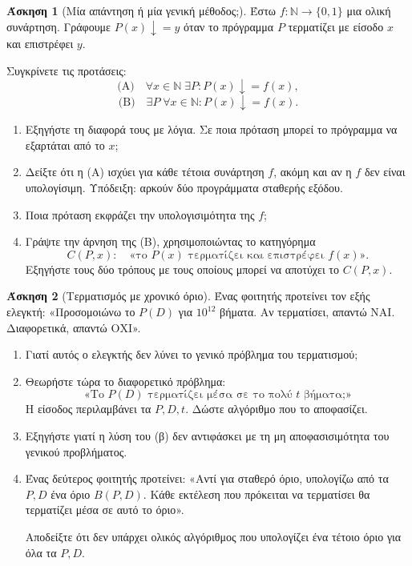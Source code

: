 \documentclass[11pt,a4paper]{article}
\theoremstyle{definition}
\newtheorem{question}{Άσκηση}
\begin{document}
 


\begin{question}[Μία απάντηση ή μία γενική μέθοδος;]
Έστω $f:\mathbb{N}\to\{0,1\}$ μια ολική συνάρτηση.
Γράφουμε $P(x)\downarrow=y$ όταν το πρόγραμμα $P$
τερματίζει με είσοδο $x$ και επιστρέφει $y$.

Συγκρίνετε τις προτάσεις:
\[
\text{(Α)}\quad
\forall x\in\mathbb{N}\;\exists P:
P(x)\downarrow=f(x),
\]
\[
\text{(Β)}\quad
\exists P\;\forall x\in\mathbb{N}:
P(x)\downarrow=f(x).
\]

\begin{enumerate}
\item Εξηγήστε τη διαφορά τους με λόγια.
Σε ποια πρόταση μπορεί το πρόγραμμα να εξαρτάται από το $x$;

\item Δείξτε ότι η (Α) ισχύει για κάθε τέτοια συνάρτηση $f$,
ακόμη και αν η $f$ δεν είναι υπολογίσιμη.
Υπόδειξη: αρκούν δύο προγράμματα σταθερής εξόδου.

\item Ποια πρόταση εκφράζει την υπολογισιμότητα της $f$;

\item Γράψτε την άρνηση της (Β), χρησιμοποιώντας
το κατηγόρημα
\[
C(P,x):\quad
\text{«το $P(x)$ τερματίζει και επιστρέφει $f(x)$»}.
\]
Εξηγήστε τους δύο τρόπους με τους οποίους μπορεί
να αποτύχει το $C(P,x)$.
\end{enumerate}
\end{question}



\begin{question}[Τερματισμός με χρονικό όριο]
Ένας φοιτητής προτείνει τον εξής ελεγκτή:
«Προσομοιώνω το $P(D)$ για $10^{12}$ βήματα.
Αν τερματίσει, απαντώ ΝΑΙ. Διαφορετικά, απαντώ ΟΧΙ».

\begin{enumerate}
\item Γιατί αυτός ο ελεγκτής δεν λύνει το γενικό
πρόβλημα του τερματισμού;

\item Θεωρήστε τώρα το διαφορετικό πρόβλημα:
\[
\text{«Το $P(D)$ τερματίζει μέσα σε το πολύ $t$ βήματα;»}
\]
Η είσοδος περιλαμβάνει τα $P,D,t$.
Δώστε αλγόριθμο που το αποφασίζει.

\item Εξηγήστε γιατί η λύση του (β) δεν αντιφάσκει
με τη μη αποφασισιμότητα του γενικού προβλήματος.

\item Ένας δεύτερος φοιτητής προτείνει:
«Αντί για σταθερό όριο, υπολογίζω από τα $P,D$
ένα όριο $B(P,D)$.
Κάθε εκτέλεση που πρόκειται να τερματίσει
θα τερματίζει μέσα σε αυτό το όριο».

Αποδείξτε ότι δεν υπάρχει ολικός αλγόριθμος
που υπολογίζει ένα τέτοιο όριο για όλα τα $P,D$.
\end{enumerate}
\end{question}
\end{document}
